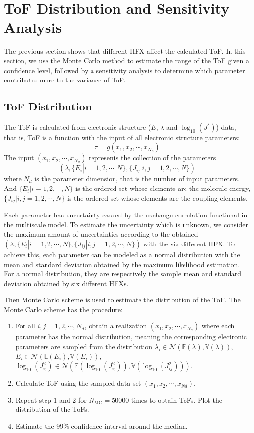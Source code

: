 \documentclass[%
 reprint,
superscriptaddress,
 amsmath,amssymb,
 aps,
prb,
floatfix
]{revtex4-2}
\begin{document}
\section{ToF Distribution and Sensitivity Analysis}
The previous section shows that different HFX affect the calculated ToF. In this section, we use the Monte Carlo method to estimate the range of the ToF given a confidence level, followed by a sensitivity analysis to determine which parameter contributes more to the variance of ToF. 

\subsection{ToF Distribution}
The ToF is calculated from electronic structure ($E$, $\lambda$ and $\log_{10}(J^2)$) data, that is, ToF is a function with the input of all electronic structure parameters:
\begin{equation}
    \tau = g(x_1, x_2, \cdots, x_{N_d})
    \label{eq:tau1}
\end{equation}
The input $(x_1, x_2, \cdots, x_{N_d})$ represents the collection of the parameters $$(\lambda, \{E_i|i=1,2,\cdots,N \}, \{J_{ij}|i,j=1,2,\cdots,N \})$$  where $N_d$ is the parameter dimension, that is the number of input parameters. 
And $\{E_i|i=1,2,\cdots,N \}$ is the ordered set whose elements are the molecule energy,
$\{J_{ij}|i,j=1,2,\cdots,N \}$ is the ordered set whose elements are the coupling elements. 

Each parameter has uncertainty caused by the exchange-correlation functional in the multiscale model.
To estimate the uncertainty which is unknown, we consider the maximum amount of uncertainties according to the obtained $(\lambda, \{E_i|i=1,2,\cdots,N \}, \{J_{ij}|i,j=1,2,\cdots,N \})$ with the six different HFX.
To achieve this, each parameter can be modeled as a normal distribution with the mean and standard deviation obtained by the maximum likelihood estimation. For a normal distribution, they are respectively the sample mean and standard deviation obtained by six different HFXs.

Then Monte Carlo scheme is used to estimate the distribution of the ToF. The Monte Carlo scheme has the procedure:
\begin{enumerate}
\item For all $i,j=1,2,\cdots, N_d$, obtain a realization $(x_1, x_2, \cdots, x_{N_d})$ where each parameter has the normal distribution, meaning the corresponding electronic parameters are sampled from the distribution $\lambda_i \in \mathcal{N}(\mathbb{E}(\lambda), \mathbb{V}(\lambda))$, $E_i \in \mathcal{N}(\mathbb{E}(E_i), \mathbb{V}(E_i))$, $\log_{10}(J_{ij}^2) \in \mathcal{N}(\mathbb{E}(\log_{10}(J_{ij}^2)), \mathbb{V}(\log_{10}(J_{ij}^2)))$. 
\item Calculate ToF using the sampled data set $(x_1, x_2, \cdots, x_{Nd})$. 
\item Repeat step 1 and 2 for $N_\text{MC} = 50000$ times to obtain ToFs. Plot the distribution of the ToFs.
\item Estimate the 99\% confidence interval around the median.
\end{enumerate}
\end{document}
